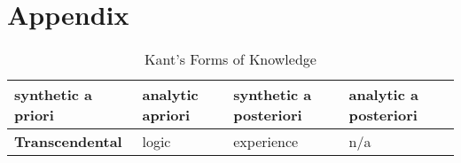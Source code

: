 \chapter{Appendix}

\begin{table}[h!]
    \centering
    \begin{tabularx}{1.05\textwidth} { 
      | X 
      | X 
      | X 
      | X | }
     \hline
     synthetic a priori & analytic apriori & synthetic a posteriori & analytic a posteriori \\
     \hline
     \textbf{Transcendental} & logic & experience & n/a \\
    \hline
    \end{tabularx}
    \caption{Kant's Forms of Knowledge}
    \label{table:1}
\end{table}